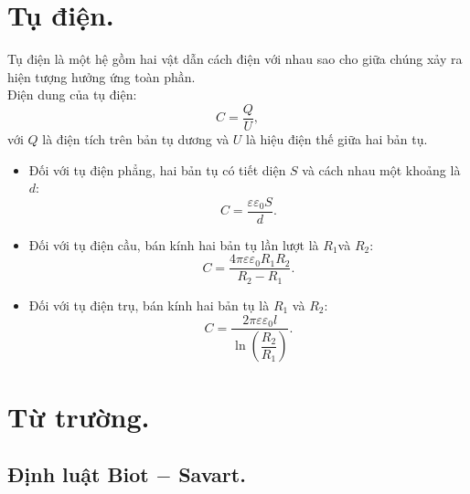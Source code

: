 \begin{appendices}
\section{Tụ điện.}
    Tụ điện là một hệ gồm hai vật dẫn cách điện với nhau sao cho giữa chúng xảy ra hiện tượng hưởng ứng toàn phần.\\
    Điện dung của tụ điện:
    $$C=\dfrac{Q}{U},$$
    với $Q$ là điện tích trên bản tụ dương và $U$ là hiệu điện thế giữa hai bản tụ.
    \begin{itemize}
        \item Đối với tụ điện phẳng, hai bản tụ có tiết diện $S$ và cách nhau một khoảng là $d$:
    $$C=\dfrac{\varepsilon\varepsilon_0S}{d}.$$
        \item Đối với tụ điện cầu, bán kính hai bản tụ lần lượt là $R_1$và $R_2$:
    $$C=\dfrac{4\pi\varepsilon\varepsilon_0R_1R_2}{R_2-R_1}.$$
        \item Đối với tụ điện trụ, bán kính hai bản tụ là $R_1$ và $R_2$:
    $$C=\dfrac{2\pi\varepsilon\varepsilon_0l}{\ln\left(\dfrac{R_2}{R_1}\right)}.$$
    \end{itemize}
    
    
\section{Từ trường.}
\subsection{Định luật Biot $-$ Savart.}
\begin{center}

\begin{tikzpicture}[x=0.75pt,y=0.75pt,yscale=-1,xscale=1]


\end{tikzpicture}
\end{center}
\end{appendices}
